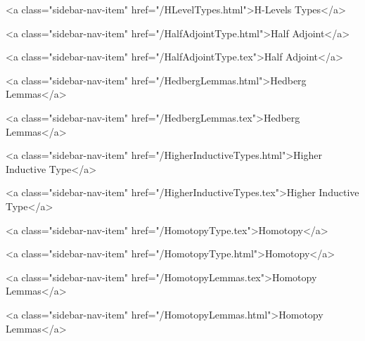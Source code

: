       
        
          <a class="sidebar-nav-item" href="/HLevelTypes.html">H-Levels Types</a>
        
      
    
      
        
          <a class="sidebar-nav-item" href="/HalfAdjointType.html">Half Adjoint</a>
        
      
    
      
        
          <a class="sidebar-nav-item" href="/HalfAdjointType.tex">Half Adjoint</a>
        
      
    
      
        
          <a class="sidebar-nav-item" href="/HedbergLemmas.html">Hedberg Lemmas</a>
        
      
    
      
        
          <a class="sidebar-nav-item" href="/HedbergLemmas.tex">Hedberg Lemmas</a>
        
      
    
      
        
          <a class="sidebar-nav-item" href="/HigherInductiveTypes.html">Higher Inductive Type</a>
        
      
    
      
        
          <a class="sidebar-nav-item" href="/HigherInductiveTypes.tex">Higher Inductive Type</a>
        
      
    
      
        
          <a class="sidebar-nav-item" href="/HomotopyType.tex">Homotopy</a>
        
      
    
      
        
          <a class="sidebar-nav-item" href="/HomotopyType.html">Homotopy</a>
        
      
    
      
        
          <a class="sidebar-nav-item" href="/HomotopyLemmas.tex">Homotopy Lemmas</a>
        
      
    
      
        
          <a class="sidebar-nav-item" href="/HomotopyLemmas.html">Homotopy Lemmas</a>
        

